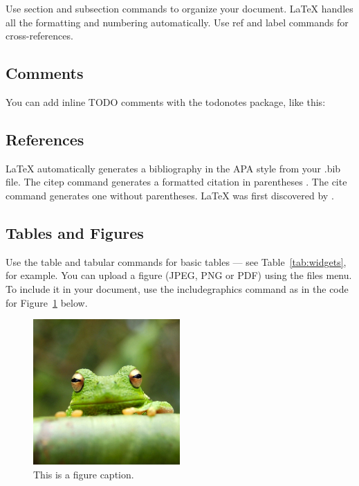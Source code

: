 \documentclass[a4paper,man,natbib]{apa6}
\begin{document}
Use section and subsection commands to organize your document. \LaTeX{} handles all the formatting and numbering automatically. Use ref and label commands for cross-references.

\subsection{Comments}

You can add inline TODO comments with the todonotes package, like this:

\subsection{References}

LaTeX automatically generates a bibliography in the APA style from your .bib file. The citep command generates a formatted citation in parentheses \citep{Lamport1986}. The cite command generates one without parentheses. LaTeX was first discovered by \cite{Lamport1986}.

\subsection{Tables and Figures}

Use the table and tabular commands for basic tables --- see Table~\ref{tab:widgets}, for example. You can upload a figure (JPEG, PNG or PDF) using the files menu. To include it in your document, use the includegraphics command as in the code for Figure~\ref{fig:frog} below.

\begin{figure}
\centering
\includegraphics[width=0.5\textwidth]{frog.jpg}
\caption{\label{fig:frog}This is a figure caption.}
\end{figure}
\end{document}
